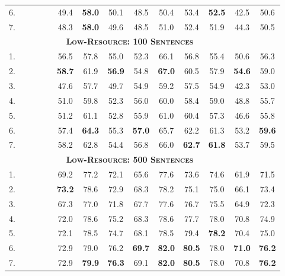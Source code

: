 \documentclass[11pt,a4paper]{article}
\newcommand{\cmark}{\textcolor{blue}{\ding{51}}}
\newcommand{\xmark}{\textcolor{red}{\ding{55}}}
\begin{document}
\begin{table*}[t]
\begin{tabular}{l|cccc||cccccccc|c}
6. & \cmark & \cmark & \cmark & \xmark & 49.4 & \textbf{58.0} & 50.1 & 48.5 & 50.4 & 53.4 & \textbf{52.5} & 42.5 & 50.6 \\
7. & \cmark & \cmark & \cmark & \cmark & 48.3 & \textbf{58.0} & 49.6 & 48.5 & 51.0 & 52.4 & 51.9 & 44.3 & 50.5 \\
\hline\hline
\multicolumn{13}{c}{\bf \textsc{Low-Resource: 100 Sentences}}\\
\hline
1. & \xmark & \cmark & \xmark & \xmark & 56.5 & 57.8 & 55.0 & 52.3 & 66.1 & 56.8 & 55.4 & 50.6 & 56.3 \\
2. & \xmark & \cmark & \cmark & \xmark & \textbf{58.7} & 61.9 & \textbf{56.9} & 54.8 & \textbf{67.0} & 60.5 & 57.9 & \textbf{54.6} & 59.0 \\
3. & \cmark & \xmark & \xmark & \xmark & 47.6 & 57.7 & 49.7 & 54.9 & 59.2 & 57.5 & 54.9 & 42.3 & 53.0 \\
4. & \cmark & \xmark & \cmark & \xmark & 51.0 & 59.8 & 52.3 & 56.0 & 60.0 & 58.4 & 59.0 & 48.8 & 55.7 \\
5. & \cmark & \xmark & \cmark & \cmark & 51.2 & 61.1 & 52.8 & 55.9 & 61.0 & 60.4 & 57.3 & 46.6 & 55.8 \\
6. & \cmark & \cmark & \cmark & \xmark & 57.4 & \textbf{64.3} & 55.3 & \textbf{57.0} & 65.7 & 62.2 & 61.3 & 53.2 & \textbf{59.6} \\
7. & \cmark & \cmark & \cmark & \cmark & 58.2 & 62.8 & 54.4 & 56.8 & 66.0 & \textbf{62.7} & \textbf{61.8} & 53.7 & 59.5 \\
\hline\hline
\multicolumn{13}{c}{\bf \textsc{Low-Resource: 500 Sentences}}\\
\hline
1. & \xmark & \cmark & \xmark & \xmark & 69.2 & 77.2 & 72.1 & 65.6 & 77.6 & 73.6 & 74.6 & 61.9 & 71.5 \\
2. & \xmark & \cmark & \cmark & \xmark & \textbf{73.2} & 78.6 & 72.9 & 68.3 & 78.2 & 75.1 & 75.0 & 66.1 & 73.4 \\
3. & \cmark & \xmark & \xmark & \xmark & 67.3 & 77.0 & 71.8 & 67.7 & 77.6 & 76.7 & 75.5 & 64.9 & 72.3 \\
4. & \cmark & \xmark & \cmark & \xmark & 72.0 & 78.6 & 75.2 & 68.3 & 78.6 & 77.7 & 78.0 & 70.8 & 74.9 \\
5. & \cmark & \xmark & \cmark & \cmark & 72.1 & 78.5 & 74.7 & 68.1 & 78.5 & 79.4 & \textbf{78.2} & 70.4 & 75.0 \\
6. & \cmark & \cmark & \cmark & \xmark & 72.9 & 79.0 & 76.2 & \textbf{69.7} & \textbf{82.0} & \textbf{80.5} & 78.0 & \textbf{71.0} & \textbf{76.2} \\
7. & \cmark & \cmark & \cmark & \cmark & 72.9 & \textbf{79.9} & \textbf{76.3} & 69.1 & \textbf{82.0} & \textbf{80.5} & 78.0 & 70.8 & \textbf{76.2} \\

\end{tabular}
\end{table*}
\end{document}

